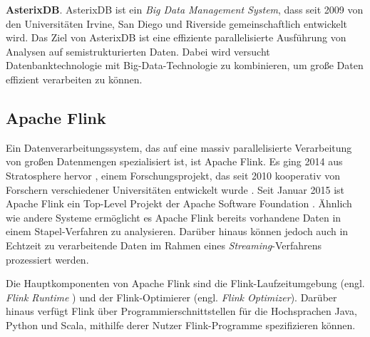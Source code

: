 \textbf{AsterixDB}. AsterixDB ist ein \textit{Big Data Management System}, dass seit 2009 von den Universitäten Irvine, San Diego und Riverside gemeinschaftlich entwickelt wird. Das Ziel von AsterixDB ist eine effiziente parallelisierte Ausführung von Analysen auf semistrukturierten Daten. Dabei wird versucht Datenbanktechnologie mit Big-Data-Technologie zu kombinieren, um große Daten effizient verarbeiten zu können.

\subsection{Apache Flink}
\label{sec:ApacheFlink}
Ein Datenverarbeitungssystem, das auf eine massiv parallelisierte Verarbeitung von großen Datenmengen spezialisiert ist, ist Apache Flink. Es ging 2014 aus Stratosphere hervor \cite{BraunWebsite}, einem Forschungsprojekt, das seit 2010 kooperativ von Forschern verschiedener Universitäten entwickelt wurde \cite{Battre2010, Alexandrov2014}. Seit Januar 2015 ist Apache Flink ein Top-Level Projekt der Apache Software Foundation \cite{ApacheFlinkBlogEntry}. 
Ähnlich wie andere Systeme ermöglicht es Apache Flink bereits vorhandene Daten in einem Stapel-Verfahren zu analysieren. Darüber hinaus können jedoch auch in Echtzeit zu verarbeitende Daten im Rahmen eines \textit{Streaming}-Verfahrens prozessiert werden. 

Die Hauptkomponenten von Apache Flink sind die Flink-Laufzeitumgebung (engl. \textit{Flink Runtime} ) und der Flink-Optimierer (engl. \textit{Flink Optimizer}). Darüber hinaus verfügt Flink über Programmierschnittstellen für die Hochsprachen Java, Python und Scala, mithilfe derer Nutzer Flink-Programme spezifizieren können. 

